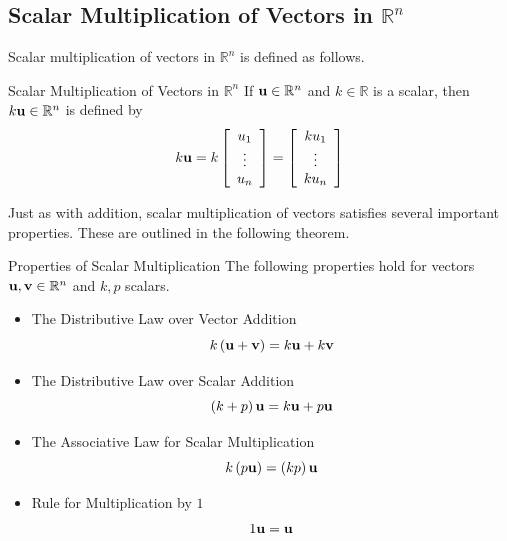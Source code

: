 \subsection{Scalar Multiplication of Vectors in \texorpdfstring{$\mathbb{R}^n$}{Rn}}

Scalar multiplication of vectors in $\mathbb{R}^n$ is defined as 
follows.

\begin{definition}{Scalar Multiplication of Vectors in $\mathbb{R}^n$}\label{def:vectorscalarmultiplication}
If $\mathbf{u}\in \mathbb{R}^{n}$ and $k\in \mathbb{R}$ is a
scalar,
 then $k\mathbf{u}\in \mathbb{R}^{n}$ is defined by
\begin{equation*}
k\mathbf{u}=k\left[ \begin{array}{c}
u_{1} \\
\vdots \\
u_{n}
\end{array}
\right] = \left[ \begin{array}{c}
ku_{1} \\
\vdots \\
ku_{n}
\end{array}
\right]
\end{equation*}
\end{definition}

Just as with addition, scalar multiplication of vectors satisfies several important properties. These are 
outlined in the following theorem. 

\begin{theorem}{Properties of Scalar Multiplication}\label{thm:vectorscalarmult}
The following properties hold for vectors $\mathbf{u},\mathbf{v}\in \mathbb{R}^{n}$ and $k,p $
scalars.
\begin{itemize}
\item The Distributive Law over Vector Addition
\begin{equation*}
k \left( \mathbf{u}+\mathbf{v}\right) = k\mathbf{u}+ k\mathbf{v}
\end{equation*}
\item The Distributive Law over Scalar Addition
\begin{equation*}
\left( k + p  \right)\mathbf{u} = k \mathbf{u}+p \mathbf{u}
\end{equation*}
\item The Associative Law for Scalar Multiplication
\begin{equation*}
k \left( p \mathbf{u}\right) = \left(k p \right)\mathbf{u}
\end{equation*}
\item Rule for Multiplication by $1$
\begin{equation*}
1\mathbf{u}=\mathbf{u}  
\end{equation*}
\end{itemize}
\end{theorem}

